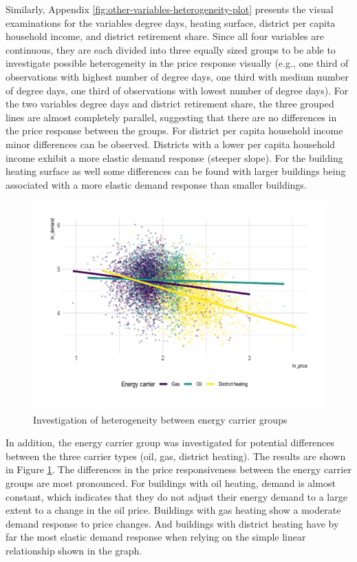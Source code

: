 \documentclass[12pt,twoside]{reedthesis}
\begin{document}
Similarly, Appendix \ref{fig:other-variables-heterogeneity-plot} presents the visual examinations for the variables degree days, heating surface, district per capita household income, and district retirement share. Since all four variables are continuous, they are each divided into three equally sized groups to be able to investigate possible heterogeneity in the price response visually (e.g., one third of observations with highest number of degree days, one third with medium number of degree days, one third of observations with lowest number of degree days). For the two variables degree days and district retirement share, the three grouped lines are almost completely parallel, suggesting that there are no differences in the price response between the groups. For district per capita household income minor differences can be observed. Districts with a lower per capita household income exhibit a more elastic demand response (steeper slope). For the building heating surface as well some differences can be found with larger buildings being associated with a more elastic demand response than smaller buildings.
\begin{figure}

{\centering \includegraphics[width=0.8\linewidth]{figure/carrier_heterogeneity_plot} 

}

\caption{Investigation of heterogeneity between energy carrier groups}\label{fig:heterogeneity-energy-carrier-plot}
\end{figure}
In addition, the energy carrier group was investigated for potential differences between the three carrier types (oil, gas, district heating). The results are shown in Figure \ref{fig:heterogeneity-energy-carrier-plot}. The differences in the price responsiveness between the energy carrier groups are most pronounced. For buildings with oil heating, demand is almost constant, which indicates that they do not adjust their energy demand to a large extent to a change in the oil price. Buildings with gas heating show a moderate demand response to price changes. And buildings with district heating have by far the most elastic demand response when relying on the simple linear relationship shown in the graph.
\end{document}
